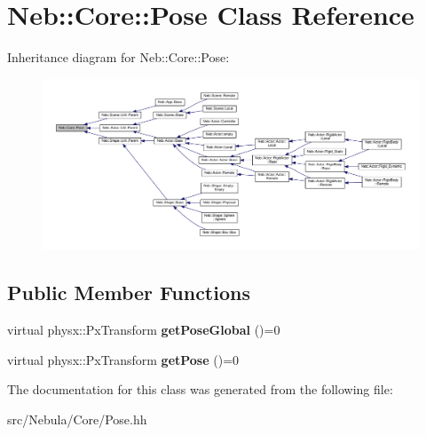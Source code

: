 \hypertarget{classNeb_1_1Core_1_1Pose}{\section{Neb\-:\-:Core\-:\-:Pose Class Reference}
\label{classNeb_1_1Core_1_1Pose}
}


Inheritance diagram for Neb\-:\-:Core\-:\-:Pose\-:
\nopagebreak
\begin{figure}[H]
\begin{center}
\leavevmode
\includegraphics[width=350pt]{classNeb_1_1Core_1_1Pose__inherit__graph}
\end{center}
\end{figure}
\subsection*{Public Member Functions}
\begin{DoxyCompactItemize}
\item 
\hypertarget{classNeb_1_1Core_1_1Pose_a68344a73874b28cfc25608c802c030ca}{virtual physx\-::\-Px\-Transform {\bfseries get\-Pose\-Global} ()=0}\label{classNeb_1_1Core_1_1Pose_a68344a73874b28cfc25608c802c030ca}

\item 
\hypertarget{classNeb_1_1Core_1_1Pose_a85727b01252cd84bfe2d99fedbacd29f}{virtual physx\-::\-Px\-Transform {\bfseries get\-Pose} ()=0}\label{classNeb_1_1Core_1_1Pose_a85727b01252cd84bfe2d99fedbacd29f}

\end{DoxyCompactItemize}


The documentation for this class was generated from the following file\-:\begin{DoxyCompactItemize}
\item 
src/\-Nebula/\-Core/Pose.\-hh\end{DoxyCompactItemize}
